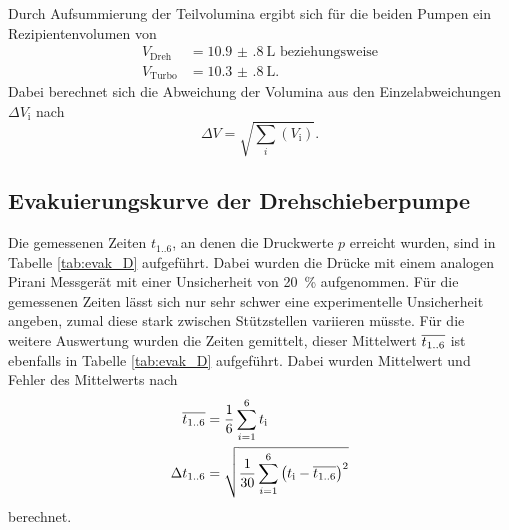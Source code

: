 Durch Aufsummierung der Teilvolumina ergibt sich für die beiden Pumpen ein Rezipientenvolumen von
\begin{align*}
  V_\text{Dreh} &= \SI{10.9(8)}{\liter} \text{ beziehungsweise}\\
  V_\text{Turbo} &= \SI{10.3(8)}{\liter}.
\end{align*}
Dabei berechnet sich die Abweichung der Volumina aus den
Einzelabweichungen $\Delta V_\text{i}$ nach
\begin{equation*}
  \Delta V = \sqrt{\sum_i \left(V_\text{i}\right)}.
\end{equation*}


\subsection{Evakuierungskurve der Drehschieberpumpe}
\label{sec:AuswEvaD}

Die gemessenen Zeiten $t_\text{1..6}$, an denen die Druckwerte $p$ erreicht
wurden, sind in Tabelle \ref{tab:evak_D} aufgeführt. Dabei wurden die Drücke
mit einem analogen Pirani Messgerät mit einer
Unsicherheit von \SI{20}{\percent} aufgenommen. Für die gemessenen Zeiten lässt
sich nur sehr schwer eine experimentelle Unsicherheit angeben, zumal diese stark
zwischen Stützstellen variieren müsste. Für die weitere Auswertung wurden die
Zeiten gemittelt, dieser Mittelwert $\overline{t_\text{1..6}}$ ist ebenfalls in
Tabelle \ref{tab:evak_D} aufgeführt.
Dabei wurden Mittelwert und Fehler des Mittelwerts nach
\begin{align*}
  \overline{t_\text{1..6}} &= \frac{1}{6} \sum_{i = 1}^6 t_\text{i} \\
  \Delta t_\text{1..6} &=
  \sqrt{\frac{1}{30} \sum_{i = 1}^6 \left(t_\text{i} - \overline{t_\text{1..6}}\right)^2}
\end{align*}
berechnet.



